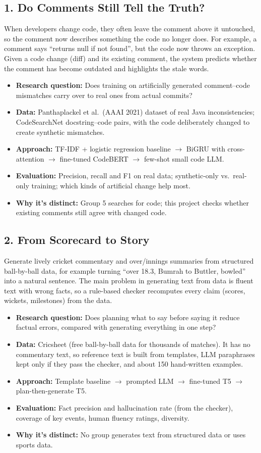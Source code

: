 \documentclass[11pt,a4paper]{article}
\newcommand{\project}[7]{%
  \needspace{14\baselineskip}
  \subsection{#1}
  #2
  \begin{itemize}
    \item \textbf{Research question:} #3
    \item \textbf{Data:} #4
    \item \textbf{Approach:} #5
    \item \textbf{Evaluation:} #6
    \item \textbf{Why it's distinct:} #7
  \end{itemize}}
\begin{document}
\project{1. Do Comments Still Tell the Truth?}
  {When developers change code, they often leave the comment above it untouched, so the comment
   now describes something the code no longer does. For example, a comment says
   ``returns null if not found'', but the code now throws an exception. Given a code change (diff)
   and its existing comment, the system predicts whether the comment has become outdated and
   highlights the stale words.}
  {Does training on artificially generated comment--code mismatches carry over to real ones from
   actual commits?}
  {Panthaplackel et al.\ (AAAI 2021) dataset of real Java inconsistencies; CodeSearchNet
   docstring--code pairs, with the code deliberately changed to create synthetic mismatches.}
  {TF-IDF + logistic regression baseline $\to$ BiGRU with cross-attention $\to$ fine-tuned
   CodeBERT $\to$ few-shot small code LLM.}
  {Precision, recall and F1 on real data; synthetic-only vs.\ real-only training; which kinds of
   artificial change help most.}
  {Group 5 searches for code; this project checks whether existing comments still agree with changed code.}

\project{2. From Scorecard to Story}
  {Generate lively cricket commentary and over/innings summaries from structured ball-by-ball data,
   for example turning ``over 18.3, Bumrah to Buttler, bowled'' into a natural sentence. The main
   problem in generating text from data is fluent text with wrong facts, so a rule-based checker
   recomputes every claim (scores, wickets, milestones) from the data.}
  {Does planning what to say before saying it reduce factual errors, compared with generating
   everything in one step?}
  {Cricsheet (free ball-by-ball data for thousands of matches). It has no commentary text, so
   reference text is built from templates, LLM paraphrases kept only if they pass the checker, and
   about 150 hand-written examples.}
  {Template baseline $\to$ prompted LLM $\to$ fine-tuned T5 $\to$ plan-then-generate T5.}
  {Fact precision and hallucination rate (from the checker), coverage of key events, human
   fluency ratings, diversity.}
  {No group generates text from structured data or uses sports data.}
\end{document}
